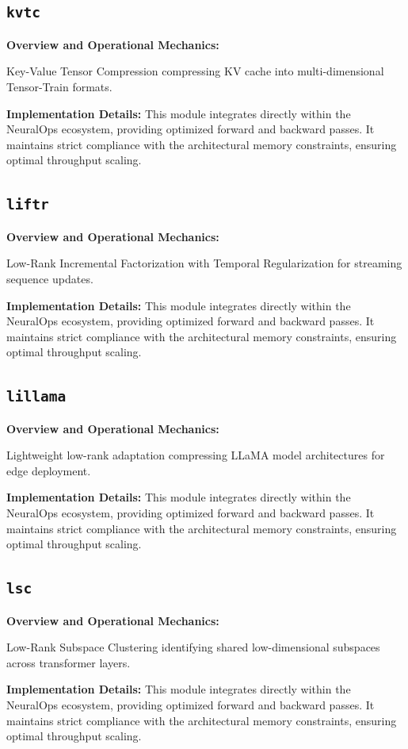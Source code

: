 \documentclass[10pt,twocolumn,letterpaper]{article}
\begin{document}
\subsection{\texttt{kvtc}}
\textbf{Overview and Operational Mechanics:}

Key-Value Tensor Compression compressing KV cache into multi-dimensional Tensor-Train formats.

\textbf{Implementation Details:}
This module integrates directly within the NeuralOps ecosystem, providing optimized forward and backward passes. It maintains strict compliance with the architectural memory constraints, ensuring optimal throughput scaling.

\subsection{\texttt{liftr}}
\textbf{Overview and Operational Mechanics:}

Low-Rank Incremental Factorization with Temporal Regularization for streaming sequence updates.

\textbf{Implementation Details:}
This module integrates directly within the NeuralOps ecosystem, providing optimized forward and backward passes. It maintains strict compliance with the architectural memory constraints, ensuring optimal throughput scaling.

\subsection{\texttt{lillama}}
\textbf{Overview and Operational Mechanics:}

Lightweight low-rank adaptation compressing LLaMA model architectures for edge deployment.

\textbf{Implementation Details:}
This module integrates directly within the NeuralOps ecosystem, providing optimized forward and backward passes. It maintains strict compliance with the architectural memory constraints, ensuring optimal throughput scaling.

\subsection{\texttt{lsc}}
\textbf{Overview and Operational Mechanics:}

Low-Rank Subspace Clustering identifying shared low-dimensional subspaces across transformer layers.

\textbf{Implementation Details:}
This module integrates directly within the NeuralOps ecosystem, providing optimized forward and backward passes. It maintains strict compliance with the architectural memory constraints, ensuring optimal throughput scaling.
\end{document}
